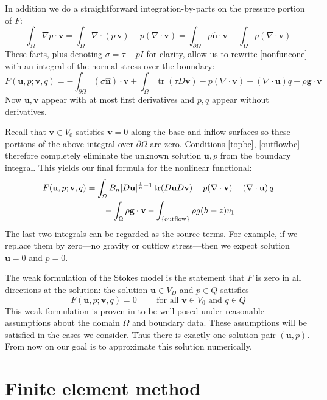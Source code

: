 \documentclass[letterpaper,final,12pt,reqno]{amsart}
\newcommand{\trace}{\operatorname{tr}}
\newcommand{\hbn}{\hat{\mathbf{n}}}
\newcommand{\bu}{\mathbf{u}}
\newcommand{\bv}{\mathbf{v}}
\begin{document}
In addition we do a straightforward integration-by-parts on the pressure portion of $F$:
    $$\int_\Omega \nabla p \cdot \bv = \int_\Omega \nabla\cdot (p\,\bv) - p (\nabla \cdot \bv) = \int_{\partial \Omega} p\hbn \cdot \bv - \int_\Omega p (\nabla \cdot \bv)$$
These facts, plus denoting $\sigma=\tau-pI$ for clarity, allow us to rewrite \eqref{nonfuncone} with an integral of the normal stress over the boundary:
\begin{equation}
F(\bu,p;\bv,q) = -\int_{\partial\Omega} (\sigma \hbn)\cdot \bv + \int_\Omega \trace(\tau D\bv) - p (\nabla \cdot \bv) - \left(\nabla \cdot \bu\right) q - \rho \mathbf{g} \cdot \bv \label{nonfunctwo}
\end{equation}
Now $\bu,\bv$ appear with at most first derivatives and $p,q$ appear without derivatives.

Recall that $\bv\in V_0$ satisfies $\bv=0$ along the base and inflow surfaces so these portions of the above integral over $\partial\Omega$ are zero.  Conditions \eqref{topbc}, \eqref{outflowbc} therefore completely eliminate the unknown solution $\bu,p$ from the boundary integral.  This yields our final formula for the nonlinear functional:
\begin{align}
F(\bu,p;\bv,q) &= \int_\Omega B_n |D\bu|^{\frac{1}{n} - 1} \trace(D\bu D\bv) - p (\nabla \cdot \bv) - \left(\nabla \cdot \bu\right) q \label{defineF} \\
    &\qquad  - \int_\Omega \rho \mathbf{g} \cdot \bv - \int_{\{\text{outflow}\}} \rho g (h-z) v_1  \notag
\end{align}
The last two integrals can be regarded as the source terms.  For example, if we replace them by zero---no gravity or outflow stress---then we expect solution $\bu=0$ and $p=0$.

The weak formulation of the Stokes model is the statement that $F$ is zero in all directions at the solution: the solution $\bu\in V_D$ and $p\in Q$ satisfies
\begin{equation}
F(\bu,p;\bv,q) = 0 \qquad \text{ for all } \bv\in V_0 \text{ and } q\in Q  \label{weak}
\end{equation}
This weak formulation is proven in \cite{JouvetRappaz2011} to be well-posed under reasonable assumptions about the domain $\Omega$ and boundary data.  These assumptions will be satisfied in the cases we consider.  Thus there is exactly one solution pair $(\bu,p)$.  From now on our goal is to approximate this solution numerically.


\section{Finite element method}
\end{document}
